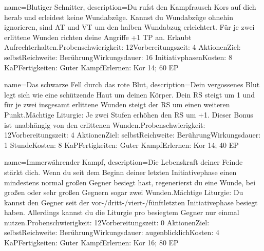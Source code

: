 {
    name={Blutiger Schnitter},
    description={Du rufst den Kampfrausch Kors auf dich herab und erleidest keine Wundabzüge. Kannst du Wundabzüge ohnehin ignorieren, sind AT und VT um den halben Wundabzug erleichtert. Für je zwei erlittene Wunden richten deine Angriffe +1 TP an. Erlaubt Aufrechterhalten.\newline Probenschwierigkeit: 12\newline Vorbereitungszeit: 4 Aktionen\newline Ziel: selbst\newline Reichweite: Berührung\newline Wirkungsdauer: 16 Initiativphasen\newline Kosten: 8 KaP\newline Fertigkeiten: Guter Kampf\newline Erlernen: Kor 14; 60 EP}
}


{
    name={Das schwarze Fell durch das rote Blut},
    description={Dein vergossenes Blut legt sich wie eine schützende Haut um deinen Körper. Dein RS steigt um 1 und für je zwei insgesamt erlittene Wunden steigt der RS um einen weiteren Punkt.\newline Mächtige Liturgie: Je zwei Stufen erhöhen den RS um +1. Dieser Bonus ist unabhängig von den erlittenen Wunden.\newline Probenschwierigkeit: 12\newline Vorbereitungszeit: 4 Aktionen\newline Ziel: selbst\newline Reichweite: Berührung\newline Wirkungsdauer: 1 Stunde\newline Kosten: 8 KaP\newline Fertigkeiten: Guter Kampf\newline Erlernen: Kor 14; 40 EP}
}


{
    name={Immerwährender Kampf},
    description={Die Lebenskraft deiner Feinde stärkt dich. Wenn du seit dem Beginn deiner letzten Initiativephase einen mindestens normal großen Gegner besiegt hast, regenerierst du eine Wunde, bei großen oder sehr großen Gegnern sogar zwei Wunden.\newline Mächtige Liturgie: Du kannst den Gegner seit der vor-/dritt-/viert-/fünftletzten Initiativephase besiegt haben. Allerdings kannst du die Liturgie pro besiegtem Gegner nur einmal nutzen.\newline Probenschwierigkeit: 12\newline Vorbereitungszeit: 0 Aktionen\newline Ziel: selbst\newline Reichweite: Berührung\newline Wirkungsdauer: augenblicklich\newline Kosten: 4 KaP\newline Fertigkeiten: Guter Kampf\newline Erlernen: Kor 16; 80 EP}
}


